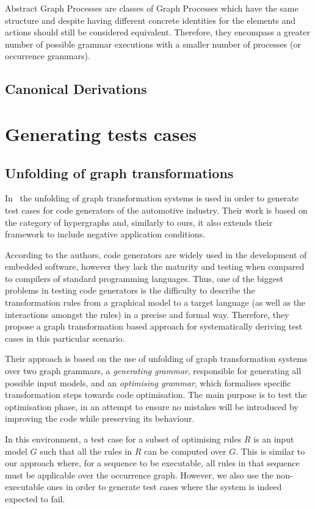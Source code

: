 Abstract Graph Processes are classes of Graph Processes which have the same structure and despite having different concrete identities for the elements and actions should still be considered equivalent. Therefore, they encompass a greater number of possible grammar executions with a smaller number of processes (or occurrence grammars).

\subsection{Canonical Derivations}

\section{Generating tests cases}

\subsection{Unfolding of graph transformations}

  In~\cite{Baldan2004} the unfolding of graph transformation systems is used in order to generate test cases for code generators of the automotive industry.
  Their work is based on the category of hypergraphs and, similarly to ours, it also extends their framework to include negative application conditions.

  According to the authors, code generators are widely used in the development of embedded software, however they lack the maturity and testing when compared to compilers of standard programming languages.
  Thus, one of the biggest problems in testing code generators is the difficulty to describe the transformation rules from a graphical model to a target language (as well as the interactions amongst the rules) in a precise and formal way.
  Therefore, they propose a graph transformation based approach for systematically deriving test cases in this particular scenario.

Their approach is based on the use of unfolding of graph transformation systems~\cite{Ribeiro1996} over two graph grammars, a \textit{generating grammar}, responsible for generating all possible input models, and an \textit{optimising grammar}, which formalises specific transformation steps towards code optimisation.
The main purpose is to test the optimisation phase, in an attempt to ensure no mistakes will be introduced by improving the code while preserving its behaviour.


In this environment, a test case for a subset of optimising rules $R$ is an input model $G$ such that all the rules in $R$ can be computed over $G$. This is similar to our approach where, for a sequence to be executable, all rules in that sequence must be applicable over the occurrence graph. However, we also use the non-executable ones in order to generate test cases where the system is indeed expected to fail.

